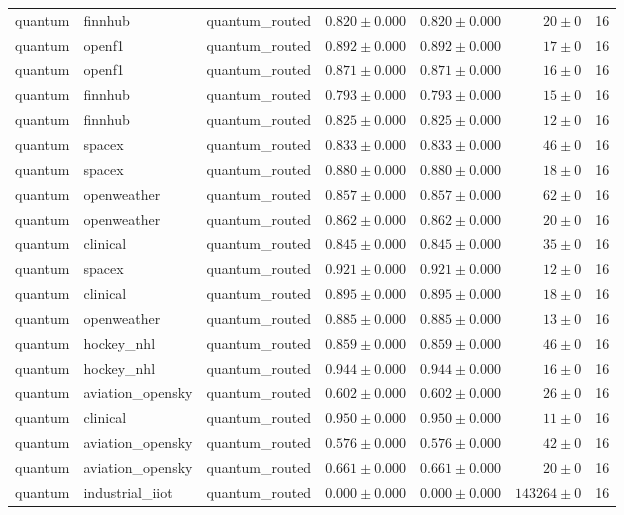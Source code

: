 \begin{table}[htbp]
\begin{tabular}{l l l r r r r}
quantum & finnhub & quantum\_routed & $0.820\pm0.000$ & $0.820\pm0.000$ & $20\pm0$ & 16 \\
quantum & openf1 & quantum\_routed & $0.892\pm0.000$ & $0.892\pm0.000$ & $17\pm0$ & 16 \\
quantum & openf1 & quantum\_routed & $0.871\pm0.000$ & $0.871\pm0.000$ & $16\pm0$ & 16 \\
quantum & finnhub & quantum\_routed & $0.793\pm0.000$ & $0.793\pm0.000$ & $15\pm0$ & 16 \\
quantum & finnhub & quantum\_routed & $0.825\pm0.000$ & $0.825\pm0.000$ & $12\pm0$ & 16 \\
quantum & spacex & quantum\_routed & $0.833\pm0.000$ & $0.833\pm0.000$ & $46\pm0$ & 16 \\
quantum & spacex & quantum\_routed & $0.880\pm0.000$ & $0.880\pm0.000$ & $18\pm0$ & 16 \\
quantum & openweather & quantum\_routed & $0.857\pm0.000$ & $0.857\pm0.000$ & $62\pm0$ & 16 \\
quantum & openweather & quantum\_routed & $0.862\pm0.000$ & $0.862\pm0.000$ & $20\pm0$ & 16 \\
quantum & clinical & quantum\_routed & $0.845\pm0.000$ & $0.845\pm0.000$ & $35\pm0$ & 16 \\
quantum & spacex & quantum\_routed & $0.921\pm0.000$ & $0.921\pm0.000$ & $12\pm0$ & 16 \\
quantum & clinical & quantum\_routed & $0.895\pm0.000$ & $0.895\pm0.000$ & $18\pm0$ & 16 \\
quantum & openweather & quantum\_routed & $0.885\pm0.000$ & $0.885\pm0.000$ & $13\pm0$ & 16 \\
quantum & hockey\_nhl & quantum\_routed & $0.859\pm0.000$ & $0.859\pm0.000$ & $46\pm0$ & 16 \\
quantum & hockey\_nhl & quantum\_routed & $0.944\pm0.000$ & $0.944\pm0.000$ & $16\pm0$ & 16 \\
quantum & aviation\_opensky & quantum\_routed & $0.602\pm0.000$ & $0.602\pm0.000$ & $26\pm0$ & 16 \\
quantum & clinical & quantum\_routed & $0.950\pm0.000$ & $0.950\pm0.000$ & $11\pm0$ & 16 \\
quantum & aviation\_opensky & quantum\_routed & $0.576\pm0.000$ & $0.576\pm0.000$ & $42\pm0$ & 16 \\
quantum & aviation\_opensky & quantum\_routed & $0.661\pm0.000$ & $0.661\pm0.000$ & $20\pm0$ & 16 \\
quantum & industrial\_iiot & quantum\_routed & $0.000\pm0.000$ & $0.000\pm0.000$ & $143264\pm0$ & 16 \\

\end{tabular}
\end{table}
